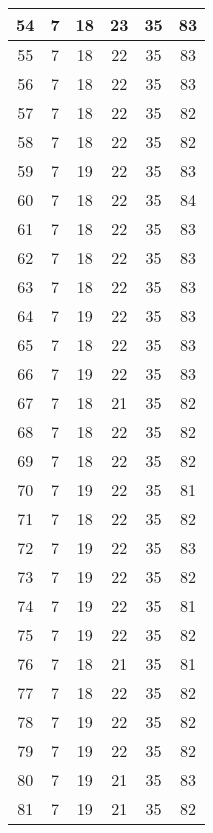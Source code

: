 \documentclass[10pt,journal,twocolumn]{IEEEtran}\IEEEoverridecommandlockouts
\begin{document}
{\begin{longtable}{|c|c|c|c|c|c|}
    54    & 7     & 18    & 23    & 35    & 83 \\\hline
    55    & 7     & 18    & 22    & 35    & 83 \\\hline
    56    & 7     & 18    & 22    & 35    & 83 \\\hline
    57    & 7     & 18    & 22    & 35    & 82 \\\hline
    58    & 7     & 18    & 22    & 35    & 82 \\\hline
    59    & 7     & 19    & 22    & 35    & 83 \\\hline
    60    & 7     & 18    & 22    & 35    & 84 \\\hline
    61    & 7     & 18    & 22    & 35    & 83 \\\hline
    62    & 7     & 18    & 22    & 35    & 83 \\\hline
    63    & 7     & 18    & 22    & 35    & 83 \\\hline
    64    & 7     & 19    & 22    & 35    & 83 \\\hline
    65    & 7     & 18    & 22    & 35    & 83 \\\hline
    66    & 7     & 19    & 22    & 35    & 83 \\\hline
    67    & 7     & 18    & 21    & 35    & 82 \\\hline
    68    & 7     & 18    & 22    & 35    & 82 \\\hline
    69    & 7     & 18    & 22    & 35    & 82 \\\hline
    70    & 7     & 19    & 22    & 35    & 81 \\\hline
    71    & 7     & 18    & 22    & 35    & 82 \\\hline
    72    & 7     & 19    & 22    & 35    & 83 \\\hline
    73    & 7     & 19    & 22    & 35    & 82 \\\hline
    74    & 7     & 19    & 22    & 35    & 81 \\\hline
    75    & 7     & 19    & 22    & 35    & 82 \\\hline
    76    & 7     & 18    & 21    & 35    & 81 \\\hline
    77    & 7     & 18    & 22    & 35    & 82 \\\hline
    78    & 7     & 19    & 22    & 35    & 82 \\\hline
    79    & 7     & 19    & 22    & 35    & 82 \\\hline
    80    & 7     & 19    & 21    & 35    & 83 \\\hline
    81    & 7     & 19    & 21    & 35    & 82 \\\hline

\end{longtable}}
\end{document}
